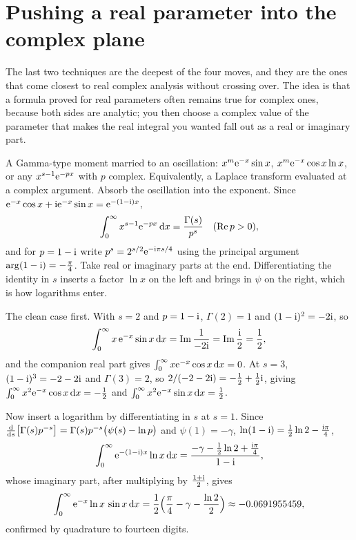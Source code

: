 \section{Pushing a real parameter into the complex plane}

The last two techniques are the deepest of the four moves, and they are the ones that come closest to real complex analysis without crossing over. The idea is that a formula proved for real parameters often remains true for complex ones, because both sides are analytic; you then choose a complex value of the parameter that makes the real integral you wanted fall out as a real or imaginary part.

\cue A Gamma-type moment married to an oscillation: $x^{m}\mathrm{e}^{-x}\sin x$, $x^{m}\mathrm{e}^{-x}\cos x\ln x$, or any $x^{s-1}\mathrm{e}^{-px}$ with $p$ complex. Equivalently, a Laplace transform evaluated at a complex argument.
\method Absorb the oscillation into the exponent. Since $\mathrm{e}^{-x}\cos x+\mathrm{i}\mathrm{e}^{-x}\sin x=\mathrm{e}^{-(1-\mathrm{i})x}$,
\[\int_0^{\infty}x^{s-1}\mathrm{e}^{-px}\,\mathrm{d} x=\frac{\Gamma(s)}{p^{s}}\quad(\operatorname{Re}p>0),\]
and for $p=1-\mathrm{i}$ write $p^{s}=2^{s/2}\mathrm{e}^{-\mathrm{i}\pi s/4}$ using the principal argument $\arg(1-\mathrm{i})=-\tfrac\pi4$. Take real or imaginary parts at the end. Differentiating the identity in $s$ inserts a factor $\ln x$ on the left and brings in $\psi$ on the right, which is how logarithms enter.

\begin{worked}
The clean case first. With $s=2$ and $p=1-\mathrm{i}$, $\Gamma(2)=1$ and $(1-\mathrm{i})^{2}=-2\mathrm{i}$, so
\[\int_0^{\infty}x\,\mathrm{e}^{-x}\sin x\,\mathrm{d} x=\operatorname{Im}\frac{1}{-2\mathrm{i}}=\operatorname{Im}\frac{\mathrm{i}}{2}=\frac12,\]
and the companion real part gives $\int_0^{\infty}x\mathrm{e}^{-x}\cos x\,\mathrm{d} x=0$. At $s=3$, $(1-\mathrm{i})^{3}=-2-2\mathrm{i}$ and $\Gamma(3)=2$, so $2/(-2-2\mathrm{i})=-\tfrac12+\tfrac12\mathrm{i}$, giving $\int_0^{\infty}x^{2}\mathrm{e}^{-x}\cos x\,\mathrm{d} x=-\tfrac12$ and $\int_0^{\infty}x^{2}\mathrm{e}^{-x}\sin x\,\mathrm{d} x=\tfrac12$.

Now insert a logarithm by differentiating in $s$ at $s=1$. Since $\frac{\mathrm{d}}{\mathrm{d}s}\bigl[\Gamma(s)p^{-s}\bigr]=\Gamma(s)p^{-s}\bigl(\psi(s)-\ln p\bigr)$ and $\psi(1)=-\gamma$, $\ln(1-\mathrm{i})=\tfrac12\ln2-\tfrac{\mathrm{i}\pi}{4}$,
\[\int_0^{\infty}\mathrm{e}^{-(1-\mathrm{i})x}\ln x\,\mathrm{d} x=\frac{-\gamma-\tfrac12\ln2+\tfrac{\mathrm{i}\pi}{4}}{1-\mathrm{i}},\]
whose imaginary part, after multiplying by $\tfrac{1+\mathrm{i}}{2}$, gives
\[\int_0^{\infty}\mathrm{e}^{-x}\ln x\,\sin x\,\mathrm{d} x=\frac12\Bigl(\frac{\pi}{4}-\gamma-\frac{\ln2}{2}\Bigr)\approx-0.0691955459,\]
confirmed by quadrature to fourteen digits.
\end{worked}

